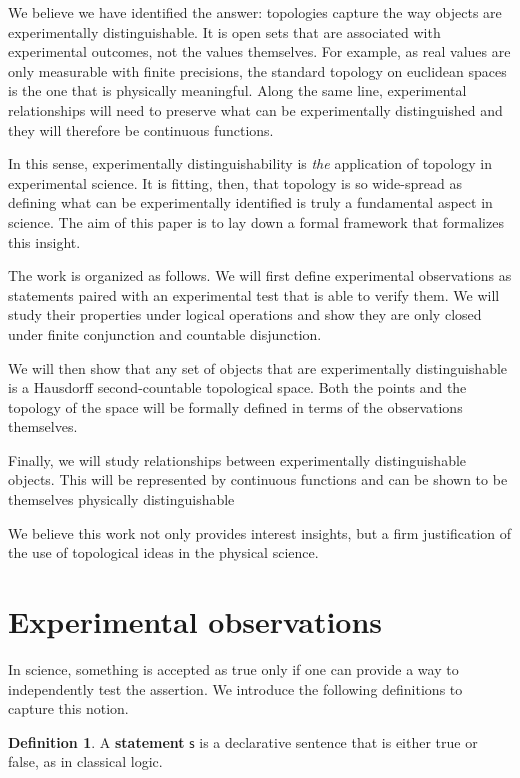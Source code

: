 \documentclass[review]{elsarticle}
\theoremstyle{plain}%
\theoremstyle{definition}
\newtheorem{defn}{Definition}[section]
\theoremstyle{remark}
\begin{document}
We believe we have identified the answer: topologies capture the way objects are experimentally distinguishable. It is open sets that are associated with experimental outcomes, not the values themselves. For example, as real values are only measurable with finite precisions, the standard topology on euclidean spaces is the one that is physically meaningful. Along the same line, experimental relationships will need to preserve what can be experimentally distinguished and they will therefore be continuous functions.

In this sense, experimentally distinguishability is \emph{the} application of topology in experimental science. It is fitting, then, that topology is so wide-spread as defining what can be experimentally identified is truly a fundamental aspect in science. The aim of this paper is to lay down a formal framework that formalizes this insight. 

The work is organized as follows. We will first define experimental observations as statements paired with an experimental test that is able to verify them. We will study their properties under logical operations and show they are only closed under finite conjunction and countable disjunction.

We will then show that any set of objects that are experimentally distinguishable is a Hausdorff second-countable topological space. Both the points and the topology of the space will be formally defined in terms of the observations themselves.

Finally, we will study relationships between experimentally distinguishable objects. This will be represented by continuous functions and can be shown to be themselves physically distinguishable

We believe this work not only provides interest insights, but a firm justification of the use of topological ideas in the physical science.

\section{Experimental observations}

In science, something is accepted as true only if one can provide a way to independently test the assertion. We introduce the following definitions to capture this notion.


\begin{defn}
	A \textbf{statement} $\mathsf{s}$ is a declarative sentence that is either true or false, as in classical logic.
\end{defn}
\end{document}
